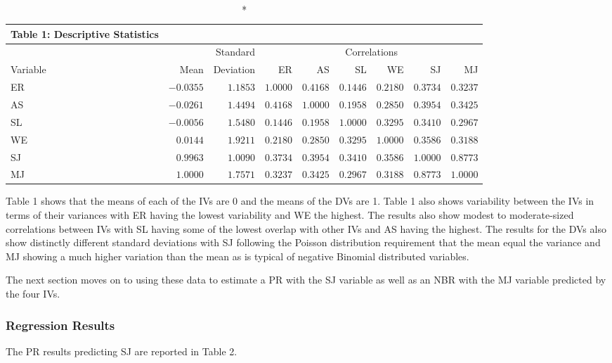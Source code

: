 \documentclass[ShortAfour,times,sageapa]{sagej}
\begin{document}
\begin{longtable}{lrr|rrrrrr}
	\caption*{
		{\large Table 1: Descriptive Statistics}
	} \\ 
	\toprule
	&  & Standard & \multicolumn{6}{c}{Correlations} \\ 
	\cmidrule(lr){4-9}
	Variable & Mean & Deviation & ER & AS & SL & WE & SJ & MJ \\ 
	\midrule
	ER & $-0.0355$ & $1.1853$ & $1.0000$ & $0.4168$ & $0.1446$ & $0.2180$ & $0.3734$ & $0.3237$ \\ 
	AS & $-0.0261$ & $1.4494$ & $0.4168$ & $1.0000$ & $0.1958$ & $0.2850$ & $0.3954$ & $0.3425$ \\ 
	SL & $-0.0056$ & $1.5480$ & $0.1446$ & $0.1958$ & $1.0000$ & $0.3295$ & $0.3410$ & $0.2967$ \\ 
	WE & $0.0144$ & $1.9211$ & $0.2180$ & $0.2850$ & $0.3295$ & $1.0000$ & $0.3586$ & $0.3188$ \\ 
	SJ & $0.9963$ & $1.0090$ & $0.3734$ & $0.3954$ & $0.3410$ & $0.3586$ & $1.0000$ & $0.8773$ \\ 
	MJ & $1.0000$ & $1.7571$ & $0.3237$ & $0.3425$ & $0.2967$ & $0.3188$ & $0.8773$ & $1.0000$ \\ 
	\bottomrule
\end{longtable}

	Table 1 shows that the means of each of the IVs are 0 and the means of the DVs are 1. 
	Table 1 also shows variability between the IVs in terms of their variances with ER having the lowest variability and WE the highest.
	The results also show modest to moderate-sized correlations between IVs with SL having some of the lowest overlap with other IVs and AS having the highest.
	The results for the DVs also show distinctly different standard deviations with SJ following the Poisson distribution requirement that the mean equal the variance and MJ showing a much higher variation than the mean as is typical of negative Binomial distributed variables.
	
	The next section moves on to using these data to estimate a PR with the SJ variable as well as an NBR with the MJ variable predicted by the four IVs.

		\subsubsection{Regression Results}
		
	The PR results predicting SJ are reported in Table 2. 
	
\end{document}

